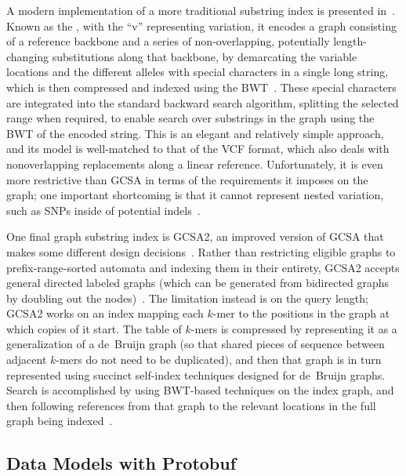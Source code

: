 A modern implementation of a more traditional substring index is presented in~\citet{maciuca2016natural}. Known as the , with the ``v'' representing variation, it encodes a graph consisting of a reference backbone and a series of non-overlapping, potentially length-changing substitutions along that backbone, by demarcating the variable locations and the different alleles with special characters in a single long string, which is then compressed and indexed using the BWT~\cite{maciuca2016natural}. These special characters are integrated into the standard backward search algorithm, splitting the selected range when required, to enable search over substrings in the graph using the BWT of the encoded string. This is an elegant and relatively simple approach, and its model is well-matched to that of the VCF format, which also deals with nonoverlapping replacements along a linear reference. Unfortunately, it is even more restrictive than GCSA in terms of the requirements it imposes on the graph; one important shortcoming is that it cannot represent nested variation, such as SNPs inside of potential indels~\citet{maciuca2016natural,siren2014indexing}.

One final graph substring index is GCSA2, an improved version of GCSA that makes some different design decisions~\cite{siren2017indexing,siren2014indexing}. Rather than restricting eligible graphs to prefix-range-sorted automata and indexing them in their entirety, GCSA2 accepts general directed labeled graphs (which can be generated from bidirected graphs by doubling out the nodes)~\cite{siren2017indexing}. The limitation instead is on the query length; GCSA2 works on an index mapping each $k$-mer to the positions in the graph at which copies of it start. The table of $k$-mers is compressed by representing it as a generalization of a de~Bruijn graph (so that shared pieces of sequence between adjacent $k$-mers do not need to be duplicated), and then that graph is in turn represented using succinct self-index techniques designed for de~Bruijn graphs. Search is accomplished by using BWT-based techniques on the index graph, and then following references from that graph to the relevant locations in the full graph being indexed~\cite{siren2017indexing}.


\subsection{Data Models with Protobuf}

